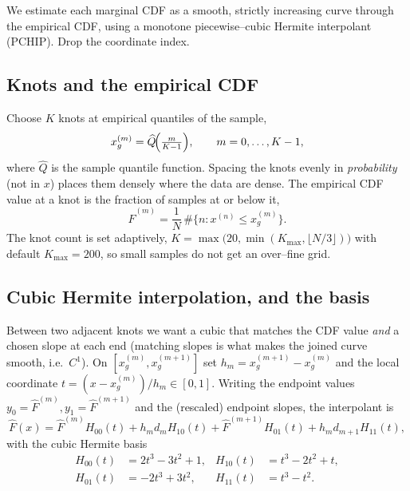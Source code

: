 \documentclass[11pt]{article}
\newcommand{\Fhat}{\widehat{F}}
\newcommand{\Qhat}{\widehat{Q}}
\theoremstyle{remark}
\begin{document}
We estimate each marginal CDF as a smooth, strictly increasing curve through the
empirical CDF, using a monotone piecewise--cubic Hermite interpolant (PCHIP).
Drop the coordinate index.

\subsection{Knots and the empirical CDF}

Choose $K$ knots at empirical quantiles of the sample,
\begin{equation}
\label{eq:knots}
x_g^{(m)}=\Qhat\!\Bigl(\tfrac{m}{K-1}\Bigr),\qquad m=0,\dots,K-1,
\end{equation}
where $\Qhat$ is the sample quantile function. Spacing the knots evenly in
\emph{probability} (not in $x$) places them densely where the data are dense.
The empirical CDF value at a knot is the fraction of samples at or below it,
\begin{equation}
\label{eq:ecdf}
\Fhat^{(m)}=\frac1N\,\#\bigl\{n:x^{(n)}\le x_g^{(m)}\bigr\}.
\end{equation}
The knot count is set adaptively,
$K=\max\!\bigl(20,\min(K_{\max},\lfloor N/3\rfloor)\bigr)$ with default
$K_{\max}=200$, so small samples do not get an over--fine grid.

\subsection{Cubic Hermite interpolation, and the basis}

Between two adjacent knots we want a cubic that matches the CDF value \emph{and}
a chosen slope at each end (matching slopes is what makes the joined curve
smooth, i.e.\ $C^1$). On $[x_g^{(m)},x_g^{(m+1)}]$ set
$h_m=x_g^{(m+1)}-x_g^{(m)}$ and the local coordinate $t=(x-x_g^{(m)})/h_m\in[0,1]$.
Writing the endpoint values $y_0=\Fhat^{(m)},y_1=\Fhat^{(m+1)}$ and the (rescaled)
endpoint slopes, the interpolant is
\begin{equation}
\label{eq:hermite}
\Fhat(x)=\Fhat^{(m)}H_{00}(t)+h_m d_m H_{10}(t)
        +\Fhat^{(m+1)}H_{01}(t)+h_m d_{m+1}H_{11}(t),
\end{equation}
with the cubic Hermite basis
\begin{equation}
\label{eq:hbasis}
\begin{aligned}
H_{00}(t)&=2t^3-3t^2+1, & H_{10}(t)&=t^3-2t^2+t,\\
H_{01}(t)&=-2t^3+3t^2,  & H_{11}(t)&=t^3-t^2.
\end{aligned}
\end{equation}
\end{document}
